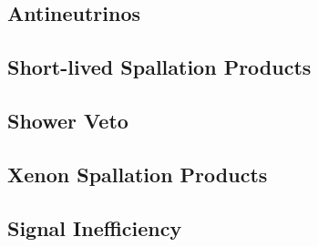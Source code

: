 \subsection{Antineutrinos}
\subsection{Short-lived Spallation Products}
\subsection{Shower Veto}
\subsection{Xenon Spallation Products}
\subsection{Signal Inefficiency}

